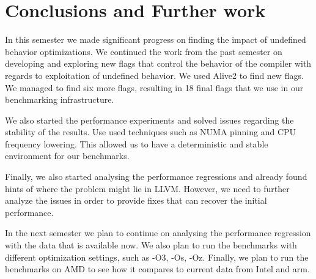 \section{Conclusions and Further work}

In this semester we made significant progress on finding the impact of undefined
behavior optimizations. We continued the work from the past semester on
developing and exploring new flags that control the behavior of the compiler
with regards to exploitation of undefined behavior. We used Alive2 to find new
flags. We managed to find six more flags, resulting in 18 final flags that we
use in our benchmarking infrastructure.

We also started the performance experiments and solved issues regarding the
stability of the results. Use used techniques such as NUMA pinning and CPU
frequency lowering. This allowed us to have a deterministic and stable
environment for our benchmarks.

Finally, we also started analysing the performance regressions and already found
hints of where the problem might lie in LLVM. However, we need to further analyze
the issues in order to provide fixes that can recover the initial performance.

In the next semester we plan to continue on analysing the performance regression
with the data that is available now. We also plan to run the benchmarks with
different optimization settings, such as -O3, -Os, -Oz. Finally, we plan to run
the benchmarks on AMD to see how it compares to current data from Intel and arm.
